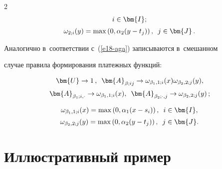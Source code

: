 \begin{multicols}{2}
\begin{multline*}
  i\in \bm{I};\\[2pt]


   \omega_{2;i}(y)=\max \left( 0,\alpha_2(y-t_j)\right), \enskip j\in \bm{J}\,.




  \end{multline*}


  


  Аналогично в~соответствии с~(\ref{e18-aga}) записываются в~смешанном 


случае правила формирования платежных функций: 


  \begin{multline*}


  \bm{U}\to 1\,,\enskip \bm{A}_{\beta;ij}\to \omega_{\beta_1,1;i}(x)\omega_{\beta_2,2;j}(y),\\[2pt]


  \bm{A}_{\beta_1;i,\cdot}\to \omega_{\beta_1,1;i}(x),\enskip


  \bm{A}_{\beta_2;\cdot,j}\to \omega_{\beta_2,2;j}(y)\,;


  \end{multline*}


  


  \vspace*{-12pt}


  


  \noindent


  \begin{multline}


  \omega_{\beta_1,1;i}(x)=\max \left( 0,\alpha_1(x-s_i)\right),\enskip i\in \bm{I},\\[2pt]


  \omega_{\beta_2,2;j}(y)=\max \left( 0,\alpha_2(y-t_j)\right),\enskip j\in\bm{J}.


  \label{e21-aga}


  \end{multline}


  


  \section{Иллюстративный пример}


  


  \vspace*{-1pt}



\end{multicols}
